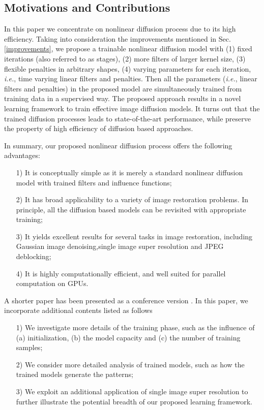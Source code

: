 \documentclass[10pt,journal,compsoc]{IEEEtran}
\newcommand{\ie}{\emph{i.e.}}
\begin{document}
{\subsection{Motivations and Contributions}\label{motivations}
In this paper we concentrate on nonlinear diffusion process due to its
high efficiency. Taking into consideration the improvements mentioned
in Sec.  \ref{improvements}, we propose a trainable nonlinear
diffusion model with (1) fixed iterations (also referred to as
stages), (2) more filters of larger kernel size, (3) flexible
penalties in arbitrary shapes, (4) varying parameters for each
iteration, \ie, time varying linear filters and penalties. Then all
the parameters (\ie, linear filters and penalties) in the proposed
model are simultaneously trained from training data in a supervised
way. The proposed approach results in a novel learning framework to
train effective image diffusion models. It turns out that the trained
diffusion processes leads to state-of-the-art performance, while
preserve the property of high efficiency of diffusion based
approaches. }
In summary, 
our proposed nonlinear diffusion process offers the following advantages: 
\begin{itemize}
\setlength\itemsep{0em}
    \item[1)] It is conceptually simple as it is merely a standard nonlinear diffusion model with trained filters and influence functions; 
    \item[2)] It has broad applicability to a variety of image restoration problems. 
In principle, all the diffusion based models can be revisited with appropriate training;
    \item[3)] It yields excellent results for several tasks in image restoration, 
including Gaussian image denoising,single image super resolution and JPEG deblocking;
    \item[4)] It is highly computationally efficient, and well suited for parallel computation on GPUs.
\end{itemize}

A shorter paper has been presented as a conference version 
\cite{ChenPock15}. In this paper, 
we incorporate additional contents listed as follows 
\begin{itemize}
\setlength\itemsep{0em}
    \item[1)] We investigate more details of the training phase, such as the influence of (a) initialization, (b) the model capacity and (c) the number of training samples; 
    \item[2)] We consider more detailed analysis of trained models, such as how the trained models generate the patterns;
    \item[3)] We exploit an additional application of single image super resolution 
to further illustrate the potential breadth of our 
proposed learning framework. 
\end{itemize}
\end{document}
